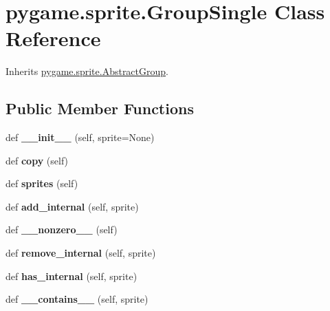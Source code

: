 \hypertarget{classpygame_1_1sprite_1_1_group_single}{}\section{pygame.\+sprite.\+Group\+Single Class Reference}
\label{classpygame_1_1sprite_1_1_group_single}


Inherits \hyperlink{classpygame_1_1sprite_1_1_abstract_group}{pygame.\+sprite.\+Abstract\+Group}.

\subsection*{Public Member Functions}
\begin{DoxyCompactItemize}
\item 
\mbox{\label{classpygame_1_1sprite_1_1_group_single_a23fd19c1eb1a7d919092130763c0385d}} 
def {\bfseries \+\_\+\+\_\+init\+\_\+\+\_\+} (self, sprite=None)
\item 
\mbox{\label{classpygame_1_1sprite_1_1_group_single_a48b1d9246c81dd0762466d122e09198e}} 
def {\bfseries copy} (self)
\item 
\mbox{\label{classpygame_1_1sprite_1_1_group_single_a7766ecaaa1f3e17df8765290385e8114}} 
def {\bfseries sprites} (self)
\item 
\mbox{\label{classpygame_1_1sprite_1_1_group_single_a6d0e95690aa031dd16459b7282e11a20}} 
def {\bfseries add\+\_\+internal} (self, sprite)
\item 
\mbox{\label{classpygame_1_1sprite_1_1_group_single_a63253db6e4bca71d65f168c8083837f1}} 
def {\bfseries \+\_\+\+\_\+nonzero\+\_\+\+\_\+} (self)
\item 
\mbox{\label{classpygame_1_1sprite_1_1_group_single_ac098bc8e816f3c6a71ae6f33af449254}} 
def {\bfseries remove\+\_\+internal} (self, sprite)
\item 
\mbox{\label{classpygame_1_1sprite_1_1_group_single_a4cc50f7cd1385b22ed7cfd12ae84f2a9}} 
def {\bfseries has\+\_\+internal} (self, sprite)
\item 
\mbox{\label{classpygame_1_1sprite_1_1_group_single_af2fa0da77be6208291b0cb3fb065902e}} 
def {\bfseries \+\_\+\+\_\+contains\+\_\+\+\_\+} (self, sprite)
\end{DoxyCompactItemize}
